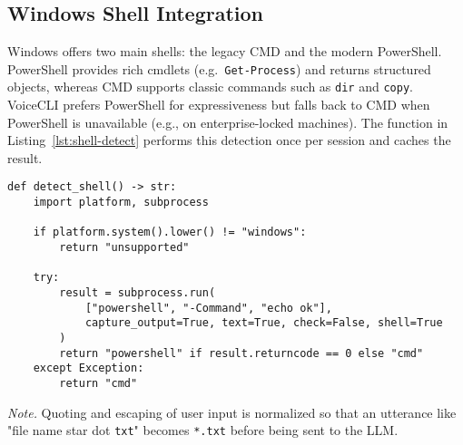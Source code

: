 \documentclass[a4paper,12pt]{article}
\begin{document}
\subsection{Windows Shell Integration}
\label{sec:windows-shell}
\noindent Windows offers two main shells: the legacy CMD and the modern PowerShell.  
PowerShell provides rich cmdlets (e.g.\ \texttt{Get-Process}) and returns structured
objects, whereas CMD supports classic commands such as \texttt{dir} and
\texttt{copy}.  VoiceCLI prefers PowerShell for expressiveness but falls back to
CMD when PowerShell is unavailable (e.g., on enterprise-locked machines).  The
function in Listing~\ref{lst:shell-detect} performs this detection once per
session and caches the result.

\newpage
\begin{lstlisting}[style=vscode,
                   caption={Shell detection with graceful fallback},
                   label={lst:shell-detect},
                   emph={detect_shell,subprocess}]
def detect_shell() -> str:
    import platform, subprocess

    if platform.system().lower() != "windows":
        return "unsupported"

    try:
        result = subprocess.run(
            ["powershell", "-Command", "echo ok"],
            capture_output=True, text=True, check=False, shell=True
        )
        return "powershell" if result.returncode == 0 else "cmd"
    except Exception:
        return "cmd"
\end{lstlisting}

\noindent
\textit{Note.} Quoting and escaping of user input is normalized so that an utterance
like "file name star dot \texttt{txt}" becomes \texttt{*.txt} before being sent
to the LLM.
\end{document}
